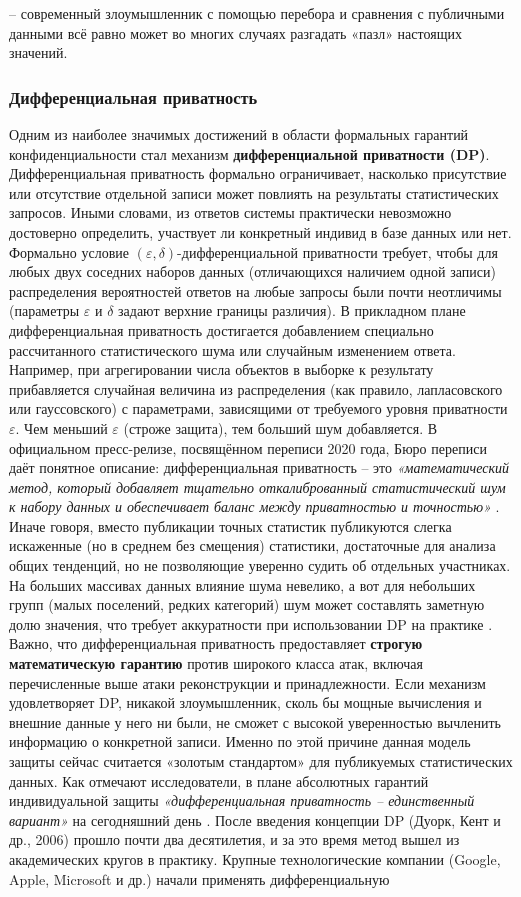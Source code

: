  – современный злоумышленник с помощью перебора и сравнения с публичными данными всё равно может во многих случаях разгадать «пазл» настоящих значений. \subsubsection{Дифференциальная приватность} \label{sec:dp}
Одним из наиболее значимых достижений в области формальных гарантий конфиденциальности стал механизм \textbf{дифференциальной приватности (DP)}. Дифференциальная приватность формально ограничивает, насколько присутствие или отсутствие отдельной записи может повлиять на результаты статистических запросов. Иными словами, из ответов системы практически невозможно достоверно определить, участвует ли конкретный индивид в базе данных или нет. Формально условие $(\varepsilon,\delta)$-дифференциальной приватности требует, чтобы для любых двух соседних наборов данных (отличающихся наличием одной записи) распределения вероятностей ответов на любые запросы были почти неотличимы (параметры $\varepsilon$ и $\delta$ задают верхние границы различия). В прикладном плане дифференциальная приватность достигается добавлением специально рассчитанного статистического шума или случайным изменением ответа. Например, при агрегировании числа объектов в выборке к результату прибавляется случайная величина из распределения (как правило, лапласовского или гауссовского) с параметрами, зависящими от требуемого уровня приватности $\varepsilon$. Чем меньший $\varepsilon$ (строже защита), тем больший шум добавляется. В официальном пресс-релизе, посвящённом переписи 2020 года, Бюро переписи даёт понятное описание: дифференциальная приватность – это \textit{«математический метод, который добавляет тщательно откалиброванный статистический шум к набору данных и обеспечивает баланс между приватностью и точностью»} \autocite{census-gov}. Иначе говоря, вместо публикации точных статистик публикуются слегка искаженные (но в среднем без смещения) статистики, достаточные для анализа общих тенденций, но не позволяющие уверенно судить об отдельных участниках. На больших массивах данных влияние шума невелико, а вот для небольших групп (малых поселений, редких категорий) шум может составлять заметную долю значения, что требует аккуратности при использовании DP на практике \autocite{cornell-edu}. Важно, что дифференциальная приватность предоставляет \textbf{строгую математическую гарантию} против широкого класса атак, включая перечисленные выше атаки реконструкции и принадлежности. Если механизм удовлетворяет DP, никакой злоумышленник, сколь бы мощные вычисления и внешние данные у него ни были, не сможет с высокой уверенностью вычленить информацию о конкретной записи. Именно по этой причине данная модель защиты сейчас считается «золотым стандартом» для публикуемых статистических данных. Как отмечают исследователи, в плане абсолютных гарантий индивидуальной защиты \textit{«дифференциальная приватность – единственный вариант»} на сегодняшний день \autocite{cornell-edu}. После введения концепции DP (Дуорк, Кент и др., 2006) прошло почти два десятилетия, и за это время метод вышел из академических кругов в практику. Крупные технологические компании (Google, Apple, Microsoft и др.) начали применять дифференциальную 